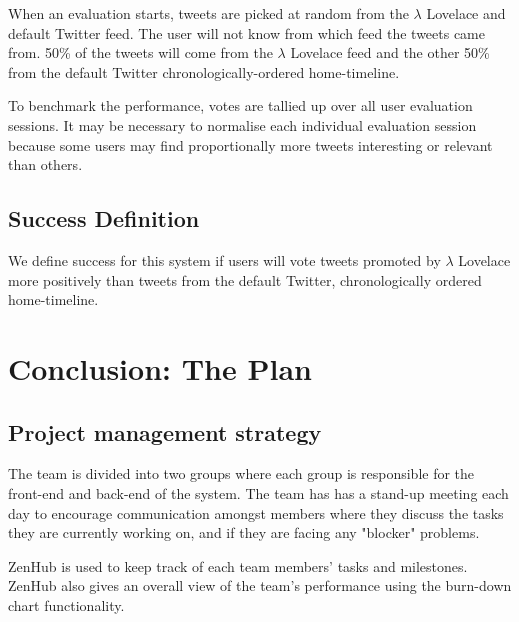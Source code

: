 \documentclass{article}
\begin{document}
When an evaluation starts, tweets are picked at random from the $\lambda$ Lovelace and default Twitter feed. The user will not know from which feed the tweets came from. 50\% of the tweets will come from the $\lambda$ Lovelace feed and the other 50\% from the default Twitter chronologically-ordered home-timeline.

To benchmark the performance, votes are tallied up over all user evaluation sessions. It may be necessary to normalise each individual evaluation session because some users may find proportionally more tweets interesting or relevant than others.

\subsection{Success Definition}
We define success for this system if users will vote tweets promoted by $\lambda$ Lovelace more positively than tweets from the default Twitter, chronologically ordered home-timeline.


\newpage


\section{Conclusion: The Plan}

\subsection{Project management strategy}
The team is divided into two groups where each group is responsible for the front-end and back-end of the system. The team has has a stand-up meeting each day to encourage communication amongst members where they discuss the tasks they are currently working on, and if they are facing any "blocker" problems.

ZenHub\cite{zenhub} is used to keep track of each team members' tasks and milestones. ZenHub also gives an overall view of the team's performance using the burn-down chart functionality.
\end{document}
